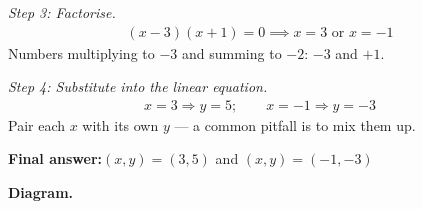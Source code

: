 \documentclass[11pt]{article}
\begin{document}
\textit{Step 3: Factorise.}
\[\begin{gathered}
(x - 3)(x + 1) = 0 \implies x = 3 \text{ or } x = -1
\end{gathered}\]
Numbers multiplying to \( -3 \) and summing to \( -2 \): \( -3 \) and \( +1 \).

\textit{Step 4: Substitute into the linear equation.}
\[\begin{gathered}
x = 3 \Rightarrow y = 5; \qquad x = -1 \Rightarrow y = -3
\end{gathered}\]
Pair each \( x \) with its own \( y \) --- a common pitfall is to mix them up.

\begin{answerbox}
\textbf{Final answer:}\quad \(\displaystyle (x, y) = (3, 5)\) and \(\displaystyle (x, y) = (-1, -3)\)
\end{answerbox}
\textbf{Diagram.}
\end{document}
